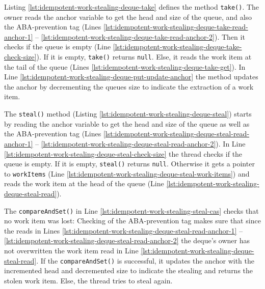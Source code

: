 

Listing \ref{lst:idempotent-work-stealing-deque-take} defines the
method \lstinline!take()!. The owner reads the anchor variable to get
the head and size of the queue, and also the ABA-prevention tag (Lines
\ref{lst:idempotent-work-stealing-deque-take-read-anchor-1} --
\ref{lst:idempotent-work-stealing-deque-take-read-anchor-2}). Then it
checks if the queue is empty (Line
\ref{lst:idempotent-work-stealing-deque-take-check-size}). If it is
empty, \lstinline!take()! returns \lstinline!null!. Else, it reads the
work item at the tail of the queue (Lines
\ref{lst:idempotent-work-stealing-deque-take-get}). In Line
\ref{lst:idempotent-work-stealing-deque-put-update-anchor} the method
updates the anchor by decrementing the queues size to indicate the
extraction of a work item.



The \lstinline!steal()! method (Listing
\ref{lst:idempotent-work-stealing-deque-steal}) starts by reading the
anchor variable to get the head and size of the queue as well as the
ABA-prevention tag (Lines
\ref{lst:idempotent-work-stealing-deque-steal-read-anchor-1} --
\ref{lst:idempotent-work-stealing-deque-steal-read-anchor-2}). In Line
\ref{lst:idempotent-work-stealing-deque-steal-check-size} the thread
checks if the queue is empty. If it is empty, \lstinline!steal()!
returns \lstinline!null!. Otherwise it gets a pointer to
\lstinline!workItems! (Line
\ref{lst:idempotent-work-stealing-deque-steal-work-items}) and reads
the work item at the head of the queue (Line
\ref{lst:idempotent-work-stealing-deque-steal-read}).

The \lstinline!compareAndSet()! in Line
\ref{lst:idempotent-work-stealing-steal-cas} checks that no work item
was lost: Checking of the ABA-prevention tag makes sure that since the
reads in Lines
\ref{lst:idempotent-work-stealing-deque-steal-read-anchor-1} --
\ref{lst:idempotent-work-stealing-deque-steal-read-anchor-2} the
deque's owner has not overwritten the work item read in Line
\ref{lst:idempotent-work-stealing-deque-steal-read}. If the
\lstinline!compareAndSet()! is successful, it updates the anchor with
the incremented head and decremented size to indicate the stealing and
returns the stolen work item. Else, the thread tries to steal again.

